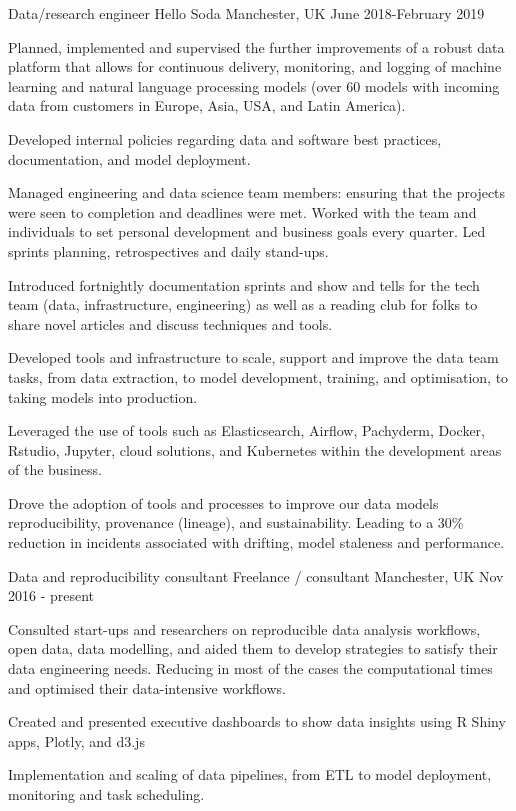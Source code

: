 \begin{cventries}

\cventry
{Data/research engineer} %
{Hello Soda } %
{Manchester, UK} %
{June 2018-February 2019 } %
{ %
\begin{cvitems}
\item {Planned, implemented and supervised the further improvements of a robust data platform that allows for continuous delivery, monitoring, and logging of machine learning and natural language processing models (over 60 models with incoming data from customers in Europe, Asia, USA, and Latin America).}
\item{Developed internal policies regarding data and software best practices, documentation, and model deployment. }
\item{Managed engineering and data science team members: ensuring that the projects were seen to completion and deadlines were met. Worked with the team and individuals to set personal development and business goals every quarter. Led sprints planning, retrospectives and daily stand-ups.}
\item{Introduced fortnightly documentation sprints and show and tells for the tech team (data, infrastructure, engineering) as well as a reading club for folks to share novel articles and discuss techniques and tools.} 
\item{Developed tools and infrastructure to scale, support and improve the data team tasks, from data extraction, to model development, training, and optimisation, to taking models into production.}
\item{Leveraged the use of tools such as Elasticsearch, Airflow, Pachyderm, Docker, Rstudio, Jupyter, cloud solutions, and Kubernetes within the development areas of the business.}
\item{Drove the adoption of tools and processes to improve our data models reproducibility, provenance (lineage), and sustainability. Leading to a 30\% reduction in incidents associated with drifting, model staleness and performance.}
\end{cvitems}
}


\cventry
{Data and reproducibility consultant } %
{Freelance / consultant } %
{Manchester,  UK} %
{Nov 2016 - present } %
{ %
\begin{cvitems}
\item {Consulted start-ups and researchers on reproducible data analysis workflows, open data, data modelling, and aided them to develop strategies to satisfy their data engineering needs. Reducing in most of the cases the computational times and optimised their data-intensive workflows.}
 \item {Created and presented executive dashboards to show data insights using R Shiny apps, Plotly, and d3.js}
 \item {Implementation and scaling of data pipelines, from ETL to model deployment, monitoring and task scheduling.}
\end{cvitems}
}



\end{cventries}
